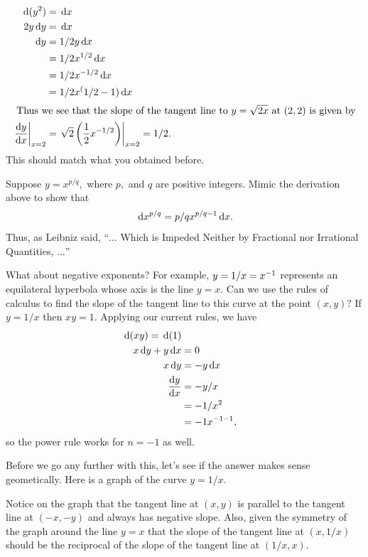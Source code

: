 \begin{align*}
  \thinspace{\rm d}(y^2)&=\thinspace{\rm d}x\\
  2y \thinspace{\rm d}y&=\thinspace{\rm d}x\\
  \thinspace{\rm d}y&=1/2y \thinspace{\rm d}x\\
      &=1/2x^{1/2} \thinspace{\rm d}x\\
      &=1/2 x^{-1/2} \thinspace{\rm d}x\\
      &=1/2  x^(1/2-1) \thinspace{\rm d}x\\
 \intertext{  Thus we see that the slope of the tangent line to $y=\sqrt{2x}$ at $(2,2)$ is given
   by}
   \left. \frac{\text{d}{y}}{\text{d}{x}}\right|_{x=2}&=\left.\sqrt{2} \left(\frac12
       x^{-1/2}\right)\right|_{x=2}=1/2.
\end{align*}
This should match what you obtained before.

\begin{embeddedproblem}{}
  Suppose $y=x^{p/q},$ where $p,$ and $q$ are positive integers.  Mimic the
  derivation above to show that
$$
\thinspace{\rm d}x^{p/q}=p/q x^{p/q-1} \thinspace{\rm d}x.
$$
Thus, as Leibniz said, ``$\ldots$ Which is Impeded Neither by Fractional nor Irrational Quantities, $\ldots$''
\end{embeddedproblem}

What about negative exponents?  For example, $y=1/x = x^{-1}$ represents an
equilateral hyperbola whose axis is the line $y=x.$  Can we use the
rules of calculus to find the slope of the tangent line to this curve
at the point $(x,y)?$  If $y=1/x$ then $xy=1.$  Applying our current rules,
we have
\begin{align*}
  \thinspace{\rm d}(xy)=\thinspace{\rm d}(1)\\
  x\thinspace{\rm d}y+y\thinspace{\rm d}x&=0\\
  x\thinspace{\rm d}y&=-y\thinspace{\rm d}x\\
  \frac{\text{d}{y}}{\text{d}{x}}&=-y/x\\
             &=-1/x^2\\
             & =-1x^{-1-1},
\end{align*}
so the power rule works for $n=-1$ as well.

Before we go any further with this, let's see if the answer makes
sense geometically.  Here is a graph of the
curve $y=1/x.$


Notice on the graph that the tangent line at $(x,y)$ is parallel to the
tangent line at $(-x,-y)$ and always has negative slope.  Also, given
the symmetry of the graph around the line $y=x$ that the slope of the
tangent line at $(x,1/x)$ should be the reciprocal of the slope of the
tangent line at $(1/x,x).$

